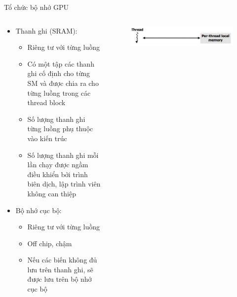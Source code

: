 \documentclass[10pt]{beamer}
\theoremstyle{remark}
\numberwithin{algocf}{section}
\numberwithin{equation}{section}
\numberwithin{dl}{section}
\numberwithin{figure}{section}
\begin{document}
\begin{frame}[shrink]{Tổ chức bộ nhớ GPU}
    \begin{columns}[onlytextwidth]
        \begin{column}{0.5\linewidth}
            \begin{itemize}
                \item Thanh ghi (SRAM):
                \begin{itemize}
                    \item Riêng tư với từng luồng
                    \item Có một tập các thanh ghi cố định cho từng SM và được chia ra cho từng luồng trong các thread block 
                    \item Số lượng thanh ghi từng luồng phụ thuộc vào kiến trúc
                    \item Số lượng thanh ghi mỗi lần chạy được ngầm điều khiển bởi trình biên dịch, lập trình viên không can thiệp
                \end{itemize}
                \item Bộ nhớ cục bộ:
                \begin{itemize}
                    \item Riêng tư với từng luồng
                    \item Off chip, chậm
                    \item Nếu các biến không đủ lưu trên thanh ghi, sẽ được lưu trên bộ nhớ cục bộ
                \end{itemize}
            \end{itemize}
        \end{column}
        \begin{column}{0.5\linewidth}
            \begin{figure}[H]
                \centering
                \includegraphics[width=0.7\linewidth]{figures/CUDA/GPU_Per_Thread_Memory.png}
            \end{figure}
        \end{column}
    \end{columns}
\end{frame}
\end{document}
